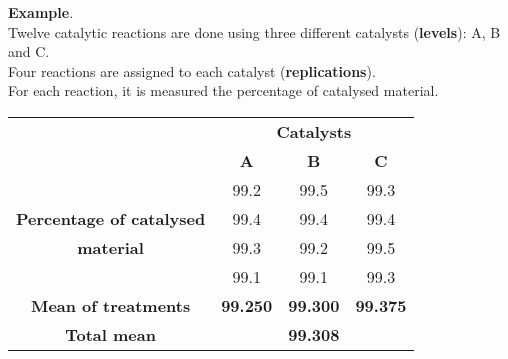\begin{frame}
  \begin{small}
    \vspace*{.25cm} 
    \textbf{Example}.\\
    Twelve catalytic reactions are done using three different catalysts (\textbf{levels}): A, B and C.\\
    Four reactions are assigned to each catalyst (\textbf{replications}).\\
    For each reaction, it is measured the percentage of catalysed material.\\
    \vspace*{.75cm}
    \begin{tabular}{|c|c|c|c|}
      \cline{2-4}
      \multicolumn{1}{c}{} & \multicolumn{3}{|c|}{\textbf{Catalysts}}\\ \cline{2-4}
      \multicolumn{1}{c|}{} & \hspace*{.7cm}\textbf{A}\hspace*{.7cm} & \hspace*{.7cm}\textbf{B}\hspace*{.7cm} & \hspace*{.7cm}\textbf{C}\hspace*{.7cm} \\ \hline
      \multicolumn{1}{|c|}{\hspace*{4.5cm}} & 99.2 & 99.5 & 99.3 \\ \cline{2-4}
      \multicolumn{1}{|c|}{\textbf{Percentage of catalysed}} & 99.4 & 99.4 & 99.4 \\ \cline{2-4}
      \multicolumn{1}{|c|}{\textbf{material}} & 99.3 & 99.2 & 99.5 \\ \cline{2-4}
      \multicolumn{1}{|c|}{} & 99.1 & 99.1 & 99.3 \\ \hline
      \multicolumn{1}{|c|}{\textbf{Mean of treatments}} & \textbf{99.250} & \textbf{99.300} & \textbf{99.375} \\ \hline
      \multicolumn{1}{|c|}{\textbf{Total mean}} & \multicolumn{3}{|c|}{\textbf{99.308}} \\ \hline 
    \end{tabular}\\
    \vspace*{.5cm}
  \end{small}
\end{frame}


